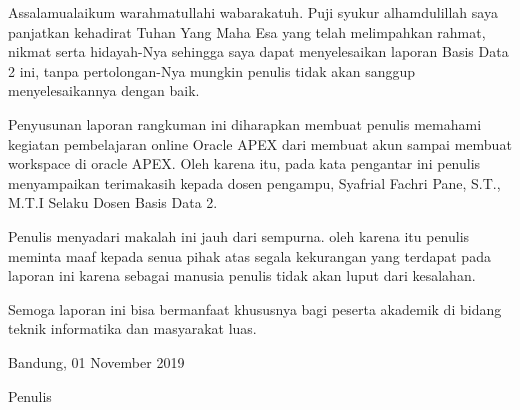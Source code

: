 \begin{acknowledgements}
Assalamualaikum warahmatullahi wabarakatuh. Puji syukur alhamdulillah saya panjatkan kehadirat Tuhan Yang Maha Esa yang telah melimpahkan rahmat, nikmat serta hidayah-Nya sehingga saya dapat menyelesaikan laporan Basis Data 2 ini, tanpa pertolongan-Nya mungkin penulis tidak akan sanggup menyelesaikannya dengan baik.

Penyusunan laporan rangkuman ini diharapkan membuat penulis memahami kegiatan pembelajaran online Oracle APEX dari membuat akun sampai membuat workspace di oracle APEX. Oleh karena itu, pada kata pengantar ini penulis menyampaikan terimakasih kepada dosen pengampu, Syafrial Fachri Pane, S.T., M.T.I Selaku Dosen Basis Data 2.

Penulis menyadari makalah ini jauh dari sempurna. oleh karena itu penulis meminta maaf kepada senua pihak atas segala kekurangan yang terdapat pada laporan ini karena sebagai manusia penulis tidak akan luput dari kesalahan.

Semoga laporan ini bisa bermanfaat khususnya bagi peserta akademik di bidang teknik informatika dan masyarakat luas.

\begin{raggedleft}

Bandung, 01 November 2019

Penulis

\end{raggedleft}

\end{acknowledgements}

